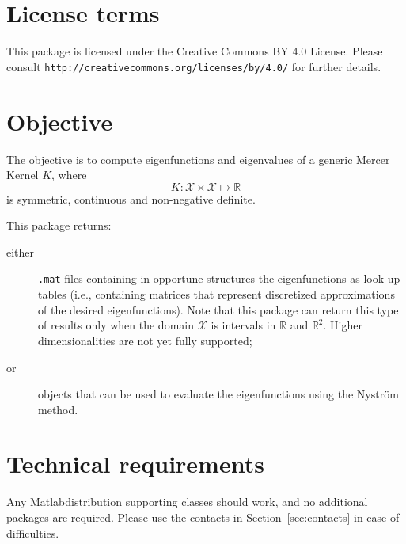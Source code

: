 \documentclass[a4paper, 10pt, twoside]{article} %
\title	{\TITLE}
\author
{
	\AUTHOR \\ \INSTITUTE
}
\date	{\today\ $\quad$ --- $\quad$ ver.\ \VERSION}
\begin{document}
\setpagewiselinenumbers
\modulolinenumbers[1]
\linenumbers

\maketitle						%
\tableofcontents				%


\section{License terms}
\label{sec:license terms}

This package is licensed under the Creative Commons BY 4.0 License. Please consult \texttt{http://creativecommons.org/licenses/by/4.0/} for further details.


\section{Objective}
\label{sec:objective}

The objective is to compute eigenfunctions and eigenvalues of a generic Mercer Kernel $K$, where
%
\begin{equation}
	K : \mathcal{X} \times \mathcal{X} \mapsto \mathbb{R}
\end{equation}
%
is symmetric, continuous and non-negative definite.

This package returns:
%
\begin{description}
	\item[either] \texttt{.mat} files containing in opportune structures the eigenfunctions as look up tables (i.e., containing matrices that represent discretized approximations of the desired eigenfunctions). Note that this package can return this type of results only when the domain $\mathcal{X}$ is intervals in $\mathbb{R}$ and $\mathbb{R}^2$. Higher dimensionalities are not yet fully supported;
	\item[or] objects that can be used to evaluate the eigenfunctions using the Nystr{\"o}m method.
\end{description}


\section{Technical requirements}
\label{sec:technical_requirements}

Any Matlab\textregistered distribution supporting classes should work, and no additional packages are required. Please use the contacts in Section~\ref{sec:contacts} in case of difficulties.
\end{document}
